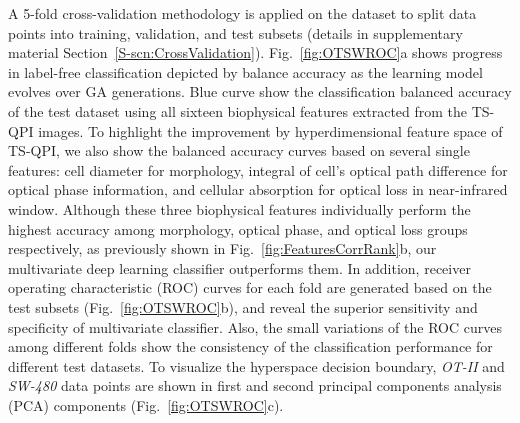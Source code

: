 \documentclass[aps,pra,reprint,longbibliography,superscriptaddress]{revtex4-1}
\begin{document}
A 5-fold cross-validation methodology is applied on the dataset to split data points into training, validation, and test subsets (details in supplementary material Section~\ref{S-scn:CrossValidation}). Fig.~\ref{fig:OTSWROC}a shows progress in label-free classification depicted by balance accuracy as the learning model evolves over GA generations. Blue curve show the classification balanced accuracy of the test dataset using all sixteen biophysical features extracted from the TS-QPI images. To highlight the improvement by hyperdimensional feature space of TS-QPI, we also show the balanced accuracy curves based on several single features: cell diameter for morphology, integral of cell's optical path difference for optical phase information, and cellular absorption for optical loss in near-infrared window. Although these three biophysical features individually perform the highest accuracy among morphology, optical phase, and optical loss groups respectively, as previously shown in Fig.~\ref{fig:FeaturesCorrRank}b, our multivariate deep learning classifier outperforms them. In addition, receiver operating characteristic (ROC) curves for each fold are generated based on the test subsets (Fig.~\ref{fig:OTSWROC}b), and reveal the superior sensitivity and specificity of multivariate classifier. Also, the small variations of the ROC curves among different folds show the consistency of the classification performance for different test datasets. To visualize the hyperspace decision boundary, \textit{OT-II} and \textit{SW-480} data points are shown in first and second principal components analysis (PCA) components (Fig.~\ref{fig:OTSWROC}c).
\end{document}
